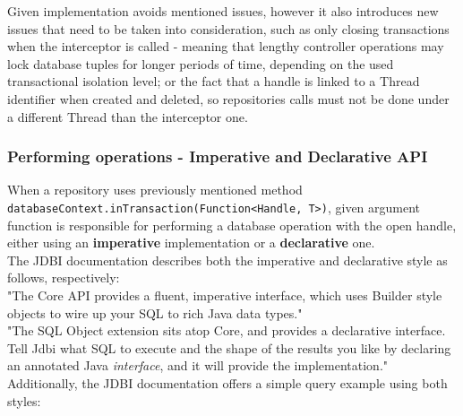 Given implementation avoids mentioned issues, however it also introduces new issues that
need to be taken into consideration, such as only closing transactions when the interceptor is
called - meaning that lengthy controller operations may lock database tuples for longer periods
of time, depending on the used transactional isolation level; or the fact that a handle is linked
to a Thread identifier when created and deleted, so repositories calls must not be done under a
different Thread than the interceptor one.\\

\subsubsection{Performing operations - Imperative and Declarative API}

When a repository uses previously mentioned method\\
\texttt{databaseContext.inTransaction(Function<Handle, T>)}, given argument function is responsible
for performing a database operation with the open handle, either using an \textbf{imperative} implementation or a \textbf{declarative} one.\\

The JDBI documentation describes both the imperative and declarative style as follows, respectively:\\

"The Core API provides a fluent, imperative interface, which uses Builder style objects to wire up your SQL to rich Java data types."\\

"The SQL Object extension sits atop Core, and provides a declarative interface. Tell Jdbi what SQL to execute and the shape of the results
you like by declaring an annotated Java \textit{interface}, and it will provide the implementation."\\

Additionally, the JDBI documentation offers a simple query example using both styles:\\

